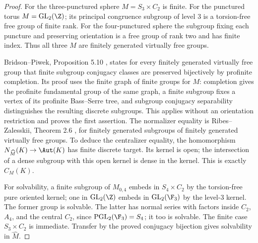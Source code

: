 \begin{proof}
For the three-punctured sphere $M=S_3\times C_2$ is finite. For the punctured torus $M=\mathrm{GL}_2(\Z)$; its principal congruence subgroup of level $3$ is a torsion-free free group of finite rank. For the four-punctured sphere the subgroup fixing each puncture and preserving orientation is a free group of rank two and has finite index. Thus all three $M$ are finitely generated virtually free groups.

Bridson--Piwek, Proposition 5.10 \cite{R-BP}, states for every finitely generated virtually free group that finite subgroup conjugacy classes are preserved bijectively by profinite completion. Its proof uses the finite graph of finite groups for $M$: completion gives the profinite fundamental group of the same graph, a finite subgroup fixes a vertex of its profinite Bass--Serre tree, and subgroup conjugacy separability distinguishes the resulting discrete subgroups. This applies without an orientation restriction and proves the first assertion. The normalizer equality is Ribes--Zalesskii, Theorem 2.6 \cite{R-RZ}, for finitely generated subgroups of finitely generated virtually free groups. To deduce the centralizer equality, the homomorphism $N_{\widehat M}(K)\to\Aut(K)$ has finite discrete target. Its kernel is open; the intersection of a dense subgroup with this open kernel is dense in the kernel. This is exactly $C_M(K)$.

For solvability, a finite subgroup of $M_{0,4}$ embeds in $S_4\times C_2$ by the torsion-free pure oriented kernel; one in $\mathrm{GL}_2(\Z)$ embeds in $\mathrm{GL}_2(\F_3)$ by the level-$3$ kernel. The former group is solvable. The latter has normal series with factors inside $C_2$, $A_4$, and the central $C_2$, since $\mathrm{PGL}_2(\F_3)=S_4$; it too is solvable. The finite case $S_3\times C_2$ is immediate. Transfer by the proved conjugacy bijection gives solvability in $\widehat M$.
\end{proof}

